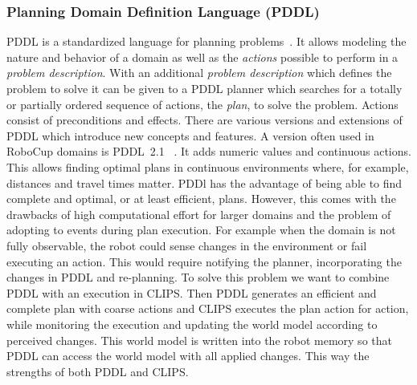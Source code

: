 \documentclass[a4paper,11pt]{article}
\newcommand{\reflst}[1]{Listing~\ref{#1}}
\begin{document}
\subsubsection{Planning Domain Definition Language (PDDL)} PDDL is a
standardized language for planning problems~\cite{PDDL}. It allows
modeling the nature and behavior of a domain as well as the
\emph{actions} possible to perform in a \emph{problem
  description}. With an additional \emph{problem description} which
defines the problem to solve it can be given to a PDDL planner which
searches for a totally or partially ordered sequence of actions, the
\emph{plan}, to solve the problem.
Actions consist of preconditions and effects.  There are
various versions and extensions of PDDL which introduce new concepts
and features. A version often used in RoboCup domains is
PDDL~2.1~\cite{PDDL2.1} . It adds numeric values and
continuous actions. This allows finding optimal plans in continuous
environments where, for example, distances and travel times
matter. PDDl has the advantage of being able to find complete and
optimal, or at least efficient, plans. However, this comes with the
drawbacks of high computational effort for larger domains and the
problem of adopting to events during plan execution. For example when
the domain is not fully observable, the robot could sense changes in
the environment or fail executing an action. This would require
notifying the planner, incorporating the changes in PDDL and
re-planning. To solve this problem we want to combine PDDL with an
execution in CLIPS. Then PDDL generates an efficient and complete plan
with coarse actions and CLIPS executes the plan action for action,
while monitoring the execution and updating the world model according
to perceived changes. This world model is written into the robot
memory so that PDDL can access the world model with all applied
changes. This way the strengths of both PDDL and CLIPS.
\end{document}
